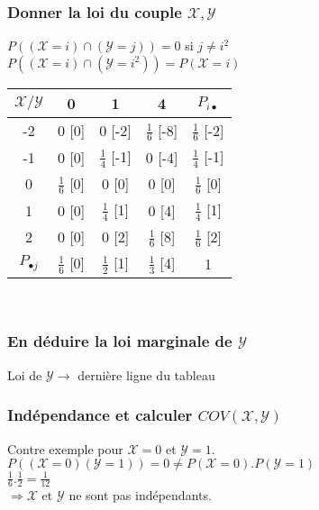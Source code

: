 \documentclass[a4paper, 12pt]{article}
\begin{document}
\subsubsection{Donner la loi du couple $\mathcal{X, Y}$}
\begin{flushleft}
$P ((\mathcal{X} = i) \cap (\mathcal{Y} = j)) = 0$ si $j \neq i^2$\\
$P ((\mathcal{X} = i) \cap (\mathcal{Y} = i^2)) = P (\mathcal{X} = i)$
\end{flushleft}
{
\Large
\begin{center}
\begin{tabular}{c|ccc|c}
	$\mathcal{X/Y}$ & 0 & 1 & 4 & $P_{i \bullet}$ \\
	\hline
	-2 & 0 \tiny{[0]} & 0 \tiny{[-2]} & $\frac{1}{6}$ \tiny{[-8]} & $\frac{1}{6}$ \tiny{[-2]} \\
	-1 & 0 \tiny{[0]} & $\frac{1}{4}$ \tiny{[-1]} & 0 \tiny{[-4]} & $\frac{1}{4}$ \tiny{[-1]} \\
	0 & $\frac{1}{6}$ \tiny{[0]} & 0 \tiny{[0]} & 0 \tiny{[0]} & $\frac{1}{6}$ \tiny{[0]} \\
	1 & 0 \tiny{[0]} & $\frac{1}{4}$ \tiny{[1]} & 0 \tiny{[4]} & $\frac{1}{4}$ \tiny{[1]} \\
	2 & 0 \tiny{[0]} & 0 \tiny{[2]} & $\frac{1}{6}$ \tiny{[8]} & $\frac{1}{6}$ \tiny{[2]} \\
	\hline
	$P_{\bullet j}$ & $\frac{1}{6}$ \tiny{[0]} & $\frac{1}{2}$ \tiny{[1]} & $\frac{1}{3}$ \tiny{[4]} & 1 \\
\end{tabular}\\
\end{center}
}


\subsubsection{En déduire la loi marginale de $\mathcal{Y}$}
Loi de $\mathcal{Y} \to$ dernière ligne du tableau


\subsubsection{Indépendance et calculer $COV (\mathcal{X, Y})$}
Contre exemple pour $\mathcal{X} = 0$ et $\mathcal{Y} = 1$.\\
$P ((\mathcal{X} = 0) (\mathcal{Y} = 1)) = 0 \neq P (\mathcal{X} = 0) . P (\mathcal{Y} = 1)$\\
$\frac{1}{6} . \frac{1}{2} = \frac{1}{12}$\\
$\Rightarrow \mathcal{X}$ et $\mathcal{Y}$ ne sont pas indépendants.
\end{document}
